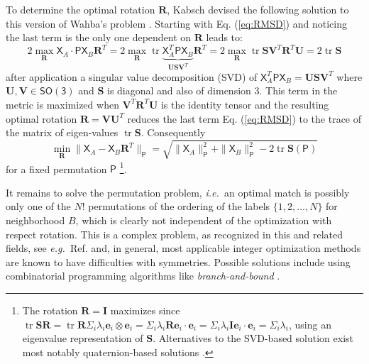 \documentclass[journal=jctcce,manuscript=article]{achemso}
\newcommand{\eref}[1]{{Eq. (\ref{#1})}}
\newcommand{\cref}[1]{{Ref. \citenum{#1}}}
\newcommand{\ie}{{\it i.e.\ }}
\newcommand{\eg}{{\it e.g.\ }}
\newcommand{\tr}{\operatorname{tr}}
\newcommand{\eb}{\mathbf{e}}
\newcommand{\Xs}{\mathsf{X}}
\newcommand{\Rb}{\mathbf{R}}
\newcommand{\Ib}{\mathbf{I}}
\newcommand{\Ps}{\mathsf{P}}
\newcommand{\Ub}{\mathbf{U}}
\newcommand{\Vb}{\mathbf{V}}
\newcommand{\Sb}{\mathbf{S}}
\begin{document}
To determine the optimal rotation $\Rb$, Kabsch \cite{Kabsch1976} devised the following solution to this version of Wahba's problem \cite{Wahba1965}.
Starting with \eref{eq:RMSD} and noticing the last term is the only one dependent on $\Rb$ leads to:
\begin{equation} \label{eq:kabsch2}
2 \max_\Rb  \Xs_A \cdot \Ps \Xs_B \Rb^T
=
2 \max_\Rb  \tr \underbrace{\Xs_A^T \Ps \Xs_B}_{\Ub \Sb \Vb^T}  \Rb^T
=
2 \max_\Rb  \tr \Sb \Vb^T \Rb^T  \Ub 
= 2 \tr \Sb
\end{equation}
after application a singular value decomposition (SVD) of $ \Xs_A^T \Ps \Xs_B = \Ub \Sb \Vb^T $ where $\Ub,\Vb \in \mathsf{SO(3)}$ and $\Sb$ is diagonal and also of dimension 3. 
This term in the metric is maximized when $\Vb^T \Rb^T \Ub$ is the identity tensor and the resulting optimal rotation $\Rb = \Vb \Ub^T$ reduces the last term \eref{eq:RMSD} to the trace of the matrix of eigen-values $\tr \Sb$.
Consequently 
\begin{equation}
\min_{\Rb} \| \Xs_A - \Xs_B \Rb^T \|_\Ps  
=  \sqrt{ \|\Xs_A\|^2_\Ps + \|\Xs_B\|^2_\Ps - 2 \tr \Sb(\Ps) }
\end{equation}
for a fixed permutation $\Ps$
\footnote{The rotation $\Rb = \Ib$ maximizes since 
$\tr \Sb \Rb  = \tr \Rb \Sigma_i \lambda_i \eb_i \otimes \eb_i = \Sigma_i \lambda_i \Rb \eb_i \cdot \eb_i = \Sigma_i \lambda_i \Ib \eb_i \cdot \eb_i = \Sigma_i \lambda_i$, using an eigenvalue representation of $\Sb$.  Alternatives to the SVD-based solution exist most notably quaternion-based solutions \cite{Liu2010,sadeghi2013metrics}.}.

It remains to solve the permutation problem, \ie an optimal match is possibly only one of the $N!$ permutations of the ordering of the labels $\{1,2,\ldots,N\}$ for neighborhood $B$, which is clearly not independent of the optimization with respect rotation. 
This is a complex problem, as recognized in this and related fields, see \eg \cref{Baudet2012} and, in general, most applicable integer optimization methods are known to have difficulties with symmetries.
Possible solutions include using combinatorial programming algorithms like \emph{branch-and-bound} \cite{Hong2007,sadeghi2013metrics}.
\end{document}
